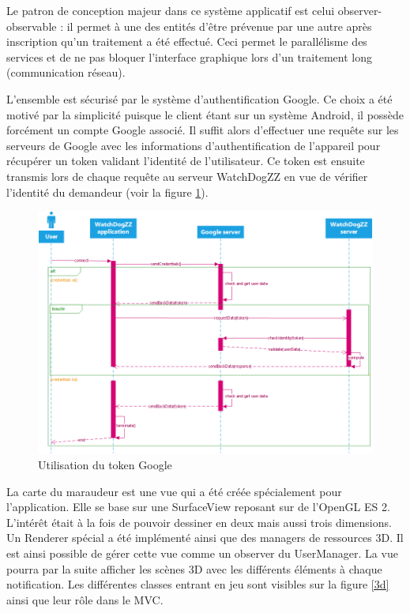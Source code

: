 Le patron de conception majeur dans ce système applicatif est celui observer-observable : il permet à une des entités d’être prévenue par une autre après inscription qu’un traitement a été effectué. Ceci permet le parallélisme des services et de ne pas bloquer l’interface graphique lors d’un traitement long (communication réseau).

L’ensemble est sécurisé par le système d’authentification Google. Ce choix a été motivé par la simplicité puisque le client étant sur un système Android, il possède forcément un compte Google associé. Il suffit alors d’effectuer une requête sur les serveurs de Google avec les informations d’authentification de l’appareil pour récupérer un token validant l’identité de l’utilisateur. Ce token est ensuite transmis lors de chaque requête au serveur WatchDogZZ en vue de vérifier l’identité du demandeur (voir la figure \ref{token}).

\begin{figure}[H]
    \centering
    \includegraphics[width=\textwidth]{./img/android-token.png}
    \caption{Utilisation du token Google}
    \label{token}
\end{figure}

La carte du maraudeur est une vue qui a été créée spécialement pour l’application. Elle se base sur une SurfaceView reposant sur de l’OpenGL ES 2. L’intérêt était à la fois de pouvoir dessiner en deux mais aussi trois dimensions. Un Renderer spécial a été implémenté ainsi que des managers de ressources 3D. Il est ainsi possible de gérer cette vue comme un observer du UserManager. La vue pourra par la suite afficher les scènes 3D avec les différents éléments à chaque notification. Les différentes classes entrant en jeu sont visibles sur la figure \ref{3d} ainsi que leur rôle dans le MVC.

